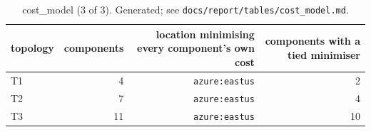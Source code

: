 \begin{table}[t]
\centering
\small
\begin{tabular}{lrrr}
\toprule
topology & components & location minimising every component's own cost & components with a tied minimiser \\
\midrule
T1 & 4 & \texttt{azure:eastus} & 2 \\
T2 & 7 & \texttt{azure:eastus} & 4 \\
T3 & 11 & \texttt{azure:eastus} & 10 \\
\bottomrule
\end{tabular}
\caption{cost\_model (3 of 3). Generated; see \texttt{docs/report/tables/cost\_model.md}.}
\label{tab:cost_model-3}
\end{table}
